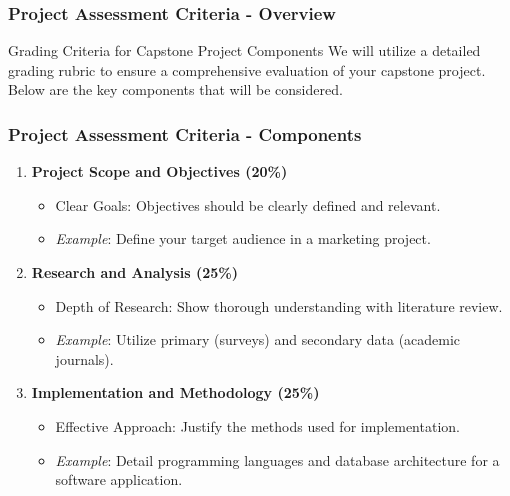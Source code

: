 \documentclass[aspectratio=169]{beamer}
\begin{document}
\begin{frame}[fragile]
    \frametitle{Project Assessment Criteria - Overview}
    \begin{block}{Grading Criteria for Capstone Project Components}
        We will utilize a detailed grading rubric to ensure a comprehensive evaluation of your capstone project. Below are the key components that will be considered.
    \end{block}
\end{frame}

\begin{frame}[fragile]
    \frametitle{Project Assessment Criteria - Components}
    \begin{enumerate}
        \item \textbf{Project Scope and Objectives (20\%)}
            \begin{itemize}
                \item Clear Goals: Objectives should be clearly defined and relevant.
                \item \textit{Example}: Define your target audience in a marketing project.
            \end{itemize}
        
        \item \textbf{Research and Analysis (25\%)}
            \begin{itemize}
                \item Depth of Research: Show thorough understanding with literature review.
                \item \textit{Example}: Utilize primary (surveys) and secondary data (academic journals).
            \end{itemize}
        
        \item \textbf{Implementation and Methodology (25\%)}
            \begin{itemize}
                \item Effective Approach: Justify the methods used for implementation.
                \item \textit{Example}: Detail programming languages and database architecture for a software application.
            \end{itemize}
    \end{enumerate}
\end{frame}
\end{document}
